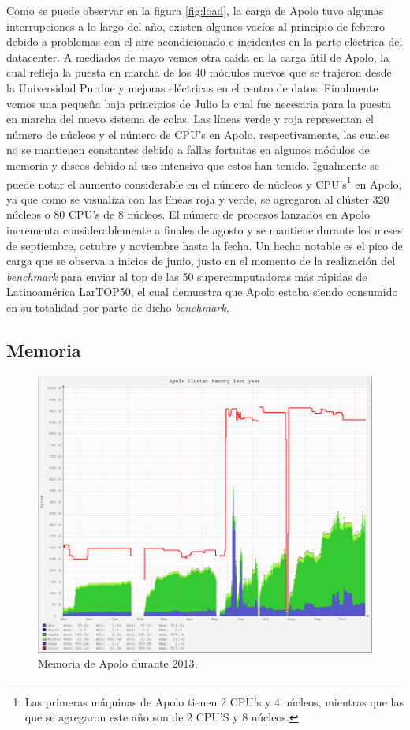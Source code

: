 Como se puede observar en la figura \ref{fig:load}, la carga de Apolo tuvo algunas interrupciones a lo largo del año, existen algunos vacíos al principio de febrero debido a problemas con el aire acondicionado e incidentes en la parte eléctrica del datacenter. A mediados de mayo vemos otra caida en la carga útil de Apolo, la cual refleja la puesta en marcha de los 40 módulos nuevos que se trajeron desde la Universidad Purdue y mejoras eléctricas en el centro de datos. Finalmente vemos una pequeña baja principios de Julio la cual fue necesaria para la puesta en marcha del nuevo sistema de colas. Las líneas verde y roja representan el número de núcleos y el número de CPU's en Apolo, respectivamente, las cuales no se mantienen constantes debido a fallas fortuitas en algunos módulos de memoria y discos debido al uso intensivo que estos han tenido. Igualmente se puede notar el aumento considerable en el número de núcleos y CPU's\footnote{Las primeras máquinas de Apolo tienen 2 CPU's y 4 núcleos, mientras que las que se agregaron este año son de 2 CPU'S y 8 núcleos.} en Apolo, ya que como se visualiza con las líneas roja y verde, se agregaron al clúster 320 núcleos o 80 CPU's de 8 núcleos. El número de procesos lanzados en Apolo incrementa considerablemente a finales de agosto y se mantiene durante los meses de septiembre, octubre y noviembre hasta la fecha. Un hecho notable es el pico de carga que se observa a inicios de junio, justo en el momento de la realización del \textit{benchmark} para enviar al top de las 50 supercomputadoras más rápidas de Latinoamérica LarTOP50, el cual demuestra que Apolo estaba siendo consumido en su totalidad por parte de dicho \textit{benchmark}.

\subsection{Memoria}
\begin{figure}[ht]
  \centering
  \includegraphics[scale=0.45]{imgs/memory2013.png}
  \caption{Memoria de Apolo durante 2013.}
  \label{fig:mem}
\end{figure}

